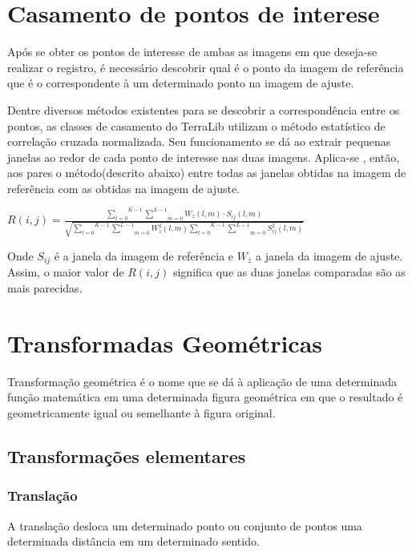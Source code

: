 \documentclass[9pt, a4paper, nofonttune, journal]{IEEEtran}
\begin{document}
\section{Casamento de pontos de interese}
Após se obter os pontos de interesse de ambas as imagens em que deseja-se realizar o registro,
é necessário descobrir qual é o ponto da imagem de referência que é o correspondente à um determinado ponto na imagem de ajuste. 

Dentre diversos métodos existentes para se descobrir a correspondência entre os pontos, as classes de casamento do TerraLib utilizam
o método estatístico de correlação cruzada normalizada.
Seu funcionamento se dá ao extrair pequenas janelas ao redor de cada ponto de interesse nas duas imagens.
Aplica-se , então, aos pares o método(descrito abaixo) entre todas as janelas obtidas na imagem de referência com as obtidas na imagem de ajuste.\cite{Fedorov1}\cite{Leila1}\cite{Zhao1}
\begin{center}
$R(i,j)=\frac{\overset{K-1}{\underset{l=0}{\sum}}\underset{m=0}{\overset{L-1}{\sum}}W_{z}(l,m)\cdot S_{ij}(l,m)}{\sqrt{\overset{K-1}{\underset{l=0}{\sum}}\underset{m=0}{\overset{L-1}{\sum}}W_{z}^{2}(l,m)\overset{K-1}{\underset{l=0}{\sum}}\underset{m=0}{\overset{L-1}{\sum}}S_{ij}^{2}(l,m)}}$\end{center}
Onde $S_{ij}$ é a janela da imagem de referência e $W_{z}$ a janela da imagem de ajuste.
Assim, o maior valor de $R(i,j)$ significa que as duas janelas comparadas são as mais parecidas.



\section{Transformadas Geométricas}
Transformação geométrica é o nome que se dá à aplicação de uma determinada função matemática em uma determinada figura geométrica 
em que o resultado é geometricamente igual ou semelhante à figura original.

\subsection{Transformações elementares}
\subsubsection{Translação}
A translação desloca um determinado ponto ou conjunto de pontos uma determinada distância em um determinado sentido.
\end{document}
